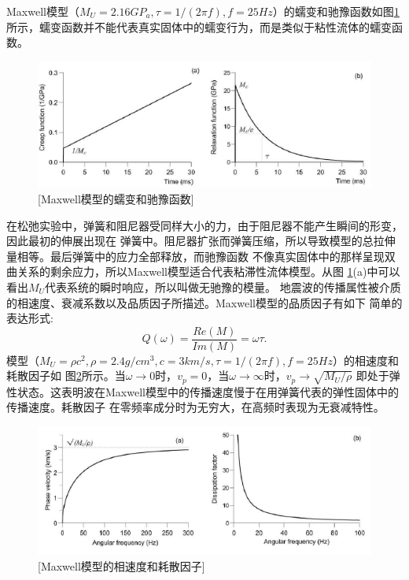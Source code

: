Maxwell模型（$M_U=2.16GP_a,\tau=1/(2\pi f),f=25Hz$）的蠕变和驰豫函数如图\ref{fig:maxwell_creep}
所示，蠕变函数并不能代表真实固体中的蠕变行为，而是类似于粘性流体的蠕变函数。
\begin{figure}[!htbp]
	    \centering
		\includegraphics[width=0.9\linewidth]{figure/maxwell_creep}
		[Maxwell模型的蠕变和驰豫函数]
		\label{fig:maxwell_creep}
\end{figure}
在松弛实验中，弹簧和阻尼器受同样大小的力，由于阻尼器不能产生瞬间的形变，因此最初的伸展出现在
弹簧中。阻尼器扩张而弹簧压缩，所以导致模型的总拉伸量相等。最后弹簧中的应力全部释放，而驰豫函数
不像真实固体中的那样呈现双曲关系的剩余应力，所以Maxwell模型适合代表粘滞性流体模型。从图
\ref{fig:maxwell_creep}(a)中可以看出$M_U$代表系统的瞬时响应，所以叫做无驰豫的模量。
地震波的传播属性被介质的相速度、衰减系数以及品质因子所描述。Maxwell模型的品质因子有如下
简单的表达形式:
\begin{equation}
	Q(\omega)=\frac{Re(M)}{Im(M)}=\omega\tau.
\end{equation}
模型（$M_U=\rho c^2, \rho=2.4g/cm^3, c=3km/s, \tau=1/(2\pi f), f=25Hz$）的相速度和耗散因子如
图\ref{fig:maxwell_vp}所示。当$\omega\to0$时，$v_p=0$，当$\omega\to\infty$时，$v_p\to\sqrt{M_U/\rho}$
即处于弹性状态。这表明波在Maxwell模型中的传播速度慢于在用弹簧代表的弹性固体中的传播速度。耗散因子
在零频率成分时为无穷大，在高频时表现为无衰减特性。
\begin{figure}[!htbp]
	    \centering
		\includegraphics[width=0.8\linewidth]{figure/maxwell_vp}
		[Maxwell模型的相速度和耗散因子]
		\label{fig:maxwell_vp}
\end{figure}


